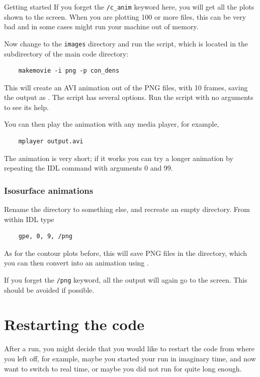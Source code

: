 \begin{chapter}{\label{cha:quickstart}Getting started}
  If you forget the \verb"/c_anim" keyword here, you will get all the plots
  shown to the screen.  When you are plotting 100 or more files, this can be
  very bad and in some cases might run your machine out of memory.

  Now change to the \verb"images" directory and run the 
  script, which is located in the  subdirectory of the main
  code directory:
  \begin{Verbatim}
    makemovie -i png -p con_dens
  \end{Verbatim}
  This will create an AVI animation out of the PNG files, with 10 frames,
  saving the output as .  The  script
  has several options.  Run the script with no arguments to see its help.

  You can then play the animation with any media player, for example,
  \begin{Verbatim}
    mplayer output.avi
  \end{Verbatim}
  The animation is very short; if it works you can try a longer animation by
  repeating the  IDL command with arguments 0 and 99.

  \subsubsection{Isosurface animations}
  Rename the  directory to something else, and recreate an
  empty  directory.  From within IDL type
  \begin{Verbatim}
    gpe, 0, 9, /png
  \end{Verbatim}
  As for the contour plots before, this will save PNG files in the
   directory, which you can then convert into an animation
  using .

  If you forget the \verb"/png" keyword, all the output will again go to the
  screen.  This should be avoided if possible.

  \section{\label{sec:restart}Restarting the code}
  After a run, you might decide that you would like to restart the code from
  where you left off, for example, maybe you started your run in imaginary
  time, and now want to switch to real time, or maybe you did not run for quite
  long enough.


\end{chapter}
